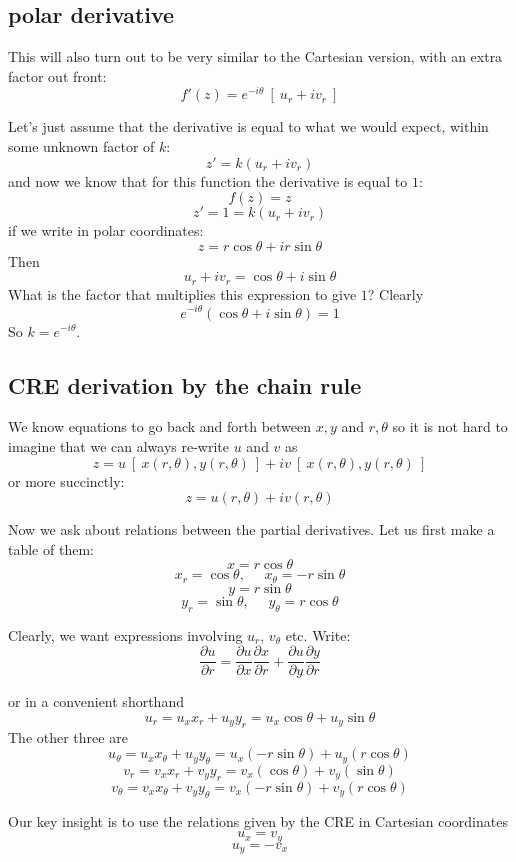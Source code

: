 \documentclass[11pt, oneside]{article}
\begin{document}
\subsection*{polar derivative} 
This will also turn out to be very similar to the Cartesian version, with an extra factor out front:
\[ f'(z) = e^{-i \theta} \ [ \ u_r + i v_r \ ] \]

Let's just assume that the derivative is equal to what we would expect, within some unknown factor of $k$:
\[ z' = k(u_r + i v_r) \]
and now we know that for this function the derivative is equal to $1$:
\[ f(z) = z \]
\[ z' = 1 = k(u_r + i v_r) \]
if we write in polar coordinates:
\[ z = r \cos \theta + i r \sin \theta \]
Then 
\[ u_r + i v_r = \cos \theta + i \sin \theta \]
What is the factor that multiplies this expression to give $1$?
Clearly
\[ e^{- i \theta} (\cos \theta + i \sin \theta) = 1 \]
So $k = e^{- i \theta}$.

\subsection*{CRE derivation by the chain rule}

We know equations to go back and forth between $x,y$ and $r, \theta$ so it is not hard to imagine that we can always re-write $u$ and $v$ as
\[ z = u \ [ \ x(r, \theta), y(r, \theta) \ ] + i v \ [ \ x(r,\theta),y(r, \theta) \ ] \]
or more succinctly:
\[ z = u(r, \theta) + i v(r, \theta) \]

Now we ask about relations between the partial derivatives.  Let us first make a table of them:
\[ x = r \cos \theta \]
\[ x_r = \cos \theta, \ \ \ \ \ \ x_{\theta} = -r \sin \theta \]
\[ y = r \sin \theta \]
\[ y_r = \sin \theta, \ \ \ \ \ \ y_{\theta} = r \cos \theta \]

Clearly, we want expressions involving $u_r$, $v_{\theta}$ etc.  Write:
\[ \frac{\partial u}{\partial r} = \frac{\partial u}{\partial x} \frac{\partial x}{\partial r} + \frac{\partial u}{\partial y} \frac{\partial y}{\partial r} \]

or in a convenient shorthand
\[ u_r = u_x x_r + u_y y_r = u_x \cos \theta + u_y \sin \theta \]
The other three are
\[ u_{\theta} = u_x x_{\theta} + u_y y_{\theta} = u_x (-r \sin \theta) + u_y (r \cos \theta)  \]
\[ v_r = v_x x_r + v_y y_r = v_x (\cos \theta) + v_y (\sin \theta)  \]
\[ v_{\theta} = v_x x_{\theta} + v_y y_{\theta} = v_x (-r \sin \theta) + v_y (r \cos \theta) \]

Our key insight is to use the relations given by the CRE in Cartesian coordinates
\[ u_x = v_y \]
\[ u_y = -v_x \]
\end{document}
